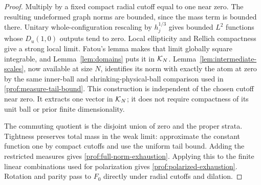 \begin{proof}
Multiply by a fixed compact radial cutoff equal to one near zero.
The resulting undeformed graph norms are bounded, since the mass term is
bounded there. Unitary whole-configuration rescaling by \(h_j^{1/3}\)
gives bounded \(L^2\) functions whose \(D_u(1,0)\) outputs tend to zero.
Local ellipticity and Rellich compactness give a strong local limit.
Fatou's lemma makes that limit globally square integrable, and
Lemma~\ref{lem:domains} puts it in \(\mathcal K_N\). Lemma~\ref{lem:intermediate-scales},
now available at size \(N\), identifies its norm with exactly the atom at
zero by the same inner-ball and shrinking-physical-ball comparison used
in \eqref{prof:measure-tail-bound}. This construction is independent of
the chosen cutoff near zero. It extracts one vector in \(\mathcal K_N\); it
does not require compactness of its unit ball or prior finite
dimensionality.

The commuting quotient is the disjoint union of zero and the proper
strata. Tightness preserves total mass in the weak limit: approximate
the constant function one by compact cutoffs and use the uniform tail
bound. Adding the restricted measures gives
\eqref{prof:full-norm-exhaustion}. Applying this to the finite linear
combinations used for polarization gives
\eqref{prof:polarized-exhaustion}. Rotation and parity pass to \(F_0\)
directly under radial cutoffs and dilation.
\end{proof}

